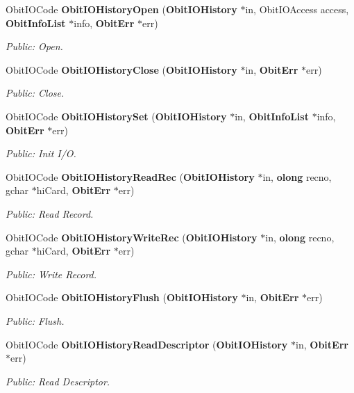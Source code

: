 \begin{CompactItemize}
Obit\-IOCode {\bf Obit\-IOHistory\-Open} ({\bf Obit\-IOHistory} $\ast$in, Obit\-IOAccess access, {\bf Obit\-Info\-List} $\ast$info, {\bf Obit\-Err} $\ast$err)
\begin{CompactList}\small\item\em Public: Open. \item\end{CompactList}\item 
Obit\-IOCode {\bf Obit\-IOHistory\-Close} ({\bf Obit\-IOHistory} $\ast$in, {\bf Obit\-Err} $\ast$err)
\begin{CompactList}\small\item\em Public: Close. \item\end{CompactList}\item 
Obit\-IOCode {\bf Obit\-IOHistory\-Set} ({\bf Obit\-IOHistory} $\ast$in, {\bf Obit\-Info\-List} $\ast$info, {\bf Obit\-Err} $\ast$err)
\begin{CompactList}\small\item\em Public: Init I/O. \item\end{CompactList}\item 
Obit\-IOCode {\bf Obit\-IOHistory\-Read\-Rec} ({\bf Obit\-IOHistory} $\ast$in, {\bf olong} recno, gchar $\ast$hi\-Card, {\bf Obit\-Err} $\ast$err)
\begin{CompactList}\small\item\em Public: Read Record. \item\end{CompactList}\item 
Obit\-IOCode {\bf Obit\-IOHistory\-Write\-Rec} ({\bf Obit\-IOHistory} $\ast$in, {\bf olong} recno, gchar $\ast$hi\-Card, {\bf Obit\-Err} $\ast$err)
\begin{CompactList}\small\item\em Public: Write Record. \item\end{CompactList}\item 
Obit\-IOCode {\bf Obit\-IOHistory\-Flush} ({\bf Obit\-IOHistory} $\ast$in, {\bf Obit\-Err} $\ast$err)
\begin{CompactList}\small\item\em Public: Flush. \item\end{CompactList}\item 
Obit\-IOCode {\bf Obit\-IOHistory\-Read\-Descriptor} ({\bf Obit\-IOHistory} $\ast$in, {\bf Obit\-Err} $\ast$err)
\begin{CompactList}\small\item\em Public: Read Descriptor. \item\end{CompactList}\item 

\end{CompactItemize}
